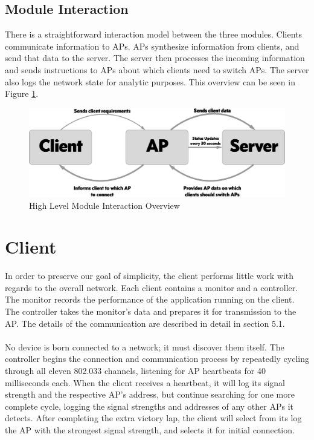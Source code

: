 \documentclass[10pt,journal,compsoc]{IEEEtran}
\begin{document}
		\subsection{Module Interaction}
		There is a straightforward interaction model between the three modules. Clients communicate information to APs. APs synthesize information from clients, and send that data to the server. The server then processes the incoming information and sends instructions to APs about which clients need to switch APs. The server also logs the network state for analytic purposes. This overview can be seen in Figure \ref{fig:overview}. 
		
        \begin{figure}
            \includegraphics[width=\linewidth]{overviewDiagram.png}
            \caption{High Level Module Interaction Overview}
            \label{fig:overview}
        \end{figure}
		
		
		\section{Client}
		In order to preserve our goal of simplicity, the client performs little work with regards to the overall network. Each client contains a monitor and a controller. The monitor records the performance of the application running on the client. The controller takes the monitor's data and prepares it for transmission to the AP. The details of the communication are described in detail in section 5.1.\\
		\\
		No device is born connected to a network; it must discover them itself. The controller begins the connection and communication process by repeatedly cycling through all eleven 802.033 channels, listening for AP heartbeats for 40 milliseconds each. When the client receives a heartbeat, it will log its signal strength and the respective AP’s address, but continue searching for one more complete cycle, logging the signal strengths and addresses of any other APs it detects. After completing the extra victory lap, the client will select from its log the AP with the strongest signal strength, and selects it for initial connection.
		
\end{document}

